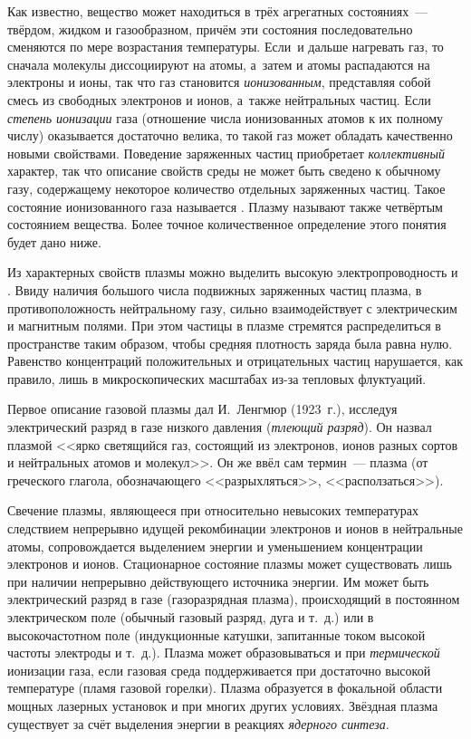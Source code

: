 
Как известно, вещество может находиться в трёх агрегатных состояниях~--- твёрдом,
жидком и газообразном, причём эти
состояния последовательно сменяются по мере возрастания температуры. Если~и
дальше нагревать газ, то сначала молекулы диссоциируют на атомы, а~затем и атомы
распадаются на электроны и ионы, так что газ становится \emph{ионизованным},
представляя собой смесь из свободных электронов и ионов, а~также нейтральных
частиц. Если \emph{степень ионизации} газа
(отношение числа ионизованных атомов к их полному числу) оказывается достаточно велика, то
такой газ может обладать качественно новыми свойствами.
Поведение заряженных частиц приобретает \emph{коллективный} характер, 
так что описание свойств среды не может быть 
сведено к обычному газу, содержащему некоторое количество отдельных заряженных частиц.
Такое состояние ионизованного газа называется .
Плазму называют также четвёртым состоянием вещества.
Более точное количественное определение этого понятия будет дано ниже.

Из характерных свойств плазмы можно выделить высокую электропроводность и
. Ввиду наличия большого числа подвижных
заряженных частиц плазма, в противоположность нейтральному газу, сильно
взаимодействует с электрическим и магнитным полями.
При этом частицы в плазме стремятся распределиться в пространстве таким образом,
чтобы средняя плотность заряда была равна нулю. Равенство концентраций
положительных и отрицательных частиц нарушается, как правило,
лишь в микроскопических масштабах из-за тепловых флуктуаций.

Первое описание газовой плазмы дал И.~Ленгмюр (1923~г.), исследуя электрический
разряд в газе низкого давления (\emph{тлеющий разряд}). Он назвал плазмой <<ярко
светящийся газ, состоящий из электронов, ионов разных сортов и нейтральных
атомов и молекул>>. Он же ввёл сам термин~--- плазма 
(от греческого глагола, обозначающего <<разрыхляться>>, <<расползаться>>).

Свечение плазмы, являющееся при относительно невысоких температурах 
следствием непрерывно идущей рекомбинации электронов и ионов в нейтральные атомы, 
сопровождается выделением энергии и уменьшением концентрации электронов и ионов. 
Стационарное состояние плазмы может существовать лишь при наличии непрерывно 
действующего источника энергии. Им может быть электрический разряд в газе 
(газоразрядная плазма),
происходящий в постоянном электрическом поле (обычный газовый разряд,
дуга и т.~д.) или в высокочастотном поле (индукционные катушки,
запитанные током высокой частоты электроды и т.~д.).
Плазма может образовываться и при \emph{термической} ионизации газа, 
если газовая среда поддерживается при достаточно высокой температуре 
(пламя газовой горелки). Плазма образуется в фокальной области мощных лазерных 
установок и при многих других условиях. 
Звёздная плазма существует за счёт выделения энергии в реакциях 
\emph{ядерного синтеза}.

